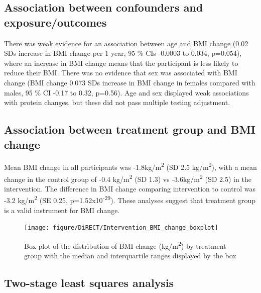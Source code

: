 \documentclass[11pt,twoside]{bristolthesis}
\begin{document}
\hypertarget{association-between-confounders-and-exposureoutcomes}{%
\subsection{Association between confounders and exposure/outcomes}\label{association-between-confounders-and-exposureoutcomes}}

There was weak evidence for an association between age and BMI change (0.02 SDs increase in BMI change per 1 year, 95 \% CIs -0.0003 to 0.034, p=0.054), where an increase in BMI change means that the participant is less likely to reduce their BMI. There was no evidence that sex was associated with BMI change (BMI change 0.073 SDs increase in BMI change in females compared with males, 95 \% CI -0.17 to 0.32, p=0.56). Age and sex displayed weak associations with protein changes, but these did not pass multiple testing adjustment.

\hypertarget{association-between-treatment-group-and-bmi-change}{%
\subsection{Association between treatment group and BMI change}\label{association-between-treatment-group-and-bmi-change}}

Mean BMI change in all participants was -1.8kg/m\textsuperscript{2} (SD 2.5 kg/m\textsuperscript{2}), with a mean change in the control group of -0.4 kg/m\textsuperscript{2} (SD 1.3) vs -3.6kg/m\textsuperscript{2} (SD 2.5) in the intervention. The difference in BMI change comparing intervention to control was -3.2 kg/m\textsuperscript{2} (SE 0.25, p=1.52x10\textsuperscript{-29}). These analyses suggest that treatment group is a valid instrument for BMI change.



\begin{figure}
\texttt{[image: figure/DiRECT/Intervention\_BMI\_change\_boxplot]} \caption[Box plot of the distribution of BMI change (kg/m\textsuperscript{2}) by treatment group]{Box plot of the distribution of BMI change (kg/m\textsuperscript{2}) by treatment group with the median and interquartile ranges displayed by the box}\label{fig:box-BMI-change}
\end{figure}
\hypertarget{two-stage-least-squares-analysis}{%
\subsection{Two-stage least squares analysis}\label{two-stage-least-squares-analysis}}
\end{document}
